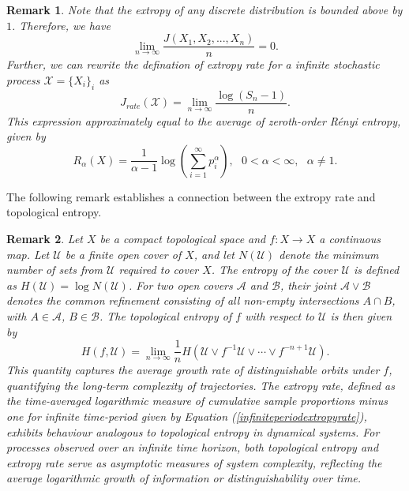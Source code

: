 \documentclass[pdflatex]{sn-jnl}%
\theoremstyle{thmstyleone}
\theoremstyle{thmstyletwo}%
\theoremstyle{thmstylethree}%
\newtheorem{remark}{Remark}%
\begin{document}
\begin{remark}
    Note that the extropy of any discrete distribution is bounded above by $1$. Therefore, we have 
     \begin{equation}
         \lim_{n\to \infty}\frac{J(X_1,X_2,...,X_n)}{n}=0.
     \end{equation}
    Further, we can rewrite the defination of extropy rate for a infinite stochastic process $\mathcal{X}=\{X_i\}_{i}$ as
    \begin{equation}\label{infiniteperiodextropyrate}
        J_{rate}(\mathcal{X})=\lim_{n\to \infty}\frac{\log(S_n-1)}{n}.
    \end{equation}
    This expression approximately equal to the average of zeroth-order Rényi entropy\cite{renyi1961measures}, given by
    \begin{equation}
        R_{\alpha}(X)=\frac{1}{\alpha-1}\log \left(\sum_{i=1}^{\infty}p_i^{\alpha} \right), \textit{ \ $0<\alpha<\infty,$ \ $\alpha\neq 1$.}
    \end{equation}
\end{remark}
The following remark establishes a connection between the extropy rate and topological entropy.
\begin{remark}
    Let $X$ be a compact topological space and $f: X \to X$ a continuous map. Let $\mathcal{U}$ be a finite open cover of $X$, and let $N(\mathcal{U})$ denote the minimum number of sets from $\mathcal{U}$ required to cover $X$. The entropy of the cover $\mathcal{U}$ is defined as $H(\mathcal{U}) = \log N(\mathcal{U})$. For two open covers $\mathcal{A}$ and $\mathcal{B}$, their joint $\mathcal{A} \vee \mathcal{B}$ denotes the common refinement consisting of all non-empty intersections $A \cap B$, with $A \in \mathcal{A}$, $B \in \mathcal{B}$. The topological entropy\cite{adler1965topological} of $f$ with respect to $\mathcal{U}$ is then given by
    \begin{equation}
H(f, \mathcal{U}) = \lim_{n \to \infty} \frac{1}{n} H\left( \mathcal{U} \vee f^{-1}\mathcal{U} \vee \cdots \vee f^{-n+1}\mathcal{U} \right). 
\end{equation}
This quantity captures the average growth rate of distinguishable orbits under $f$, quantifying the long-term complexity of trajectories. The extropy rate, defined as the time-averaged logarithmic measure of cumulative sample proportions minus one for infinite time-period given by Equation (\ref{infiniteperiodextropyrate}), exhibits behaviour analogous to topological entropy in dynamical systems. For processes observed over an infinite time horizon, both topological entropy and extropy rate serve as asymptotic measures of system complexity, reflecting the average logarithmic growth of information or distinguishability over time.
\end{remark}
\end{document}
